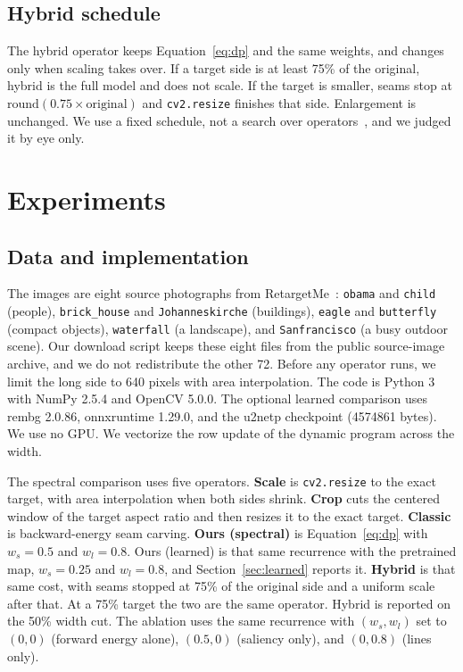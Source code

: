 \documentclass[10pt,twocolumn,letterpaper]{article}
\begin{document}
\subsection{Hybrid schedule}
The hybrid operator keeps Equation~\eqref{eq:dp} and the same weights, and changes only when scaling takes over.
If a target side is at least 75\% of the original, hybrid is the full model and does not scale.
If the target is smaller, seams stop at $\mathrm{round}(0.75 \times \text{original})$ and \texttt{cv2.resize} finishes that side.
Enlargement is unchanged.
We use a fixed schedule, not a search over operators~\cite{rubinstein2009multi}, and we judged it by eye only.

\FloatBarrier
\section{Experiments}
\label{sec:exp}

\subsection{Data and implementation}
The images are eight source photographs from RetargetMe~\cite{rubinstein2010comparative}: \texttt{obama} and \texttt{child} (people), \texttt{brick\_house} and \texttt{Johanneskirche} (buildings), \texttt{eagle} and \texttt{butterfly} (compact objects), \texttt{waterfall} (a landscape), and \texttt{Sanfrancisco} (a busy outdoor scene).
Our download script keeps these eight files from the public source-image archive, and we do not redistribute the other 72.
Before any operator runs, we limit the long side to 640 pixels with area interpolation.
The code is Python 3 with NumPy 2.5.4 and OpenCV 5.0.0.
The optional learned comparison uses rembg 2.0.86, onnxruntime 1.29.0, and the u2netp checkpoint (4574861 bytes).
We use no GPU.
We vectorize the row update of the dynamic program across the width.

The spectral comparison uses five operators.
\textbf{Scale} is \texttt{cv2.resize} to the exact target, with area interpolation when both sides shrink.
\textbf{Crop} cuts the centered window of the target aspect ratio and then resizes it to the exact target.
\textbf{Classic} is backward-energy seam carving.
\textbf{Ours (spectral)} is Equation~\eqref{eq:dp} with $w_s = 0.5$ and $w_l = 0.8$.
Ours (learned) is that same recurrence with the pretrained map, $w_s = 0.25$ and $w_l = 0.8$, and Section~\ref{sec:learned} reports it.
\textbf{Hybrid} is that same cost, with seams stopped at 75\% of the original side and a uniform scale after that.
At a 75\% target the two are the same operator.
Hybrid is reported on the 50\% width cut.
The ablation uses the same recurrence with $(w_s, w_l)$ set to $(0,0)$ (forward energy alone), $(0.5, 0)$ (saliency only), and $(0, 0.8)$ (lines only).
\end{document}
